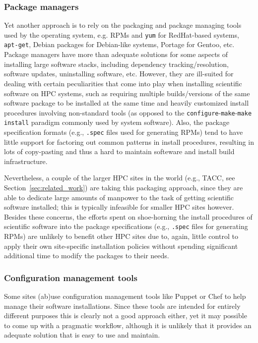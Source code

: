 \subsubsection{Package managers}

Yet another approach is to rely on the packaging and package managing tools used
by the operating system, e.g. RPMs and \texttt{yum} for RedHat-based systems,
\texttt{apt-get}, Debian packages for Debian-like systems, Portage for Gentoo, etc.
Package managers have more than adequate solutions for some aspects of
installing large software stacks, including dependency tracking/resolution, software
updates, uninstalling software, etc. However, they are ill-suited for dealing with
certain peculiarities that come into play when installing scientific software on
HPC systems, such as requiring multiple builds/versions of the same software package
to be installed at the same time and heavily customized install procedures involving
non-standard tools (as opposed to the
\texttt{configure}-\texttt{make}-\texttt{make install} paradigm commonly used by
system software). Also, the package specification formats (e.g., \texttt{.spec}
files used for generating RPMs) tend to have little support for factoring out
common patterns in install procedures, resulting in lots of copy-pasting and thus
a hard to maintain softeware and install build infrastructure.

Nevertheless, a couple of the larger HPC sites in the world
(e.g., TACC, see Section~\ref{sec:related_work}) are taking this packaging approach,
since they are able to dedicate large amounts of manpower to the task of getting
scientific software installed; this is typically infeasible for smaller HPC sites
however. Besides these concerns, the efforts spent on shoe-horning the install
procedures of scientific software into the package specifications (e.g., 
\texttt{.spec} files for generating RPMs) are unlikely to benefit other HPC sites
due to, again, little control to apply their own site-specific installation
policies without spending significant additional time to modify the packages to
their needs.

\subsubsection{Configuration management tools}

Some sites (ab)use configuration management tools like Puppet or Chef to help manage
their software installations. Since these tools are intended for entirely different
purposes this is clearly not a good approach either, yet it may possible to come up
with a pragmatic workflow, although it is unlikely that it provides an adequate
solution that is easy to use and maintain.

